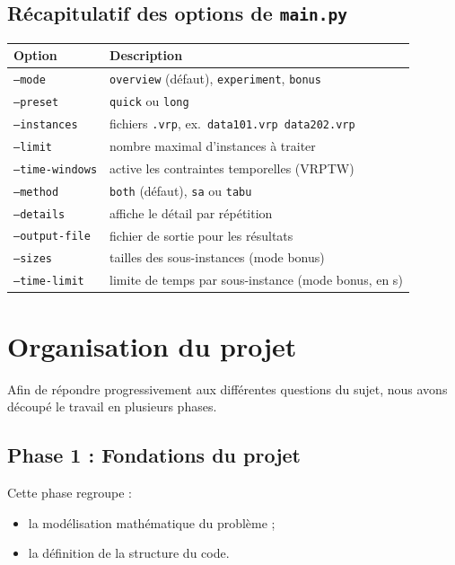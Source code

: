 \documentclass[11pt,a4paper]{article}
\begin{document}
\subsection{Récapitulatif des options de \texttt{main.py}}

\begin{center}
\begin{tabular}{ll}
\toprule
Option & Description \\
\midrule
\texttt{--mode} & \texttt{overview} (défaut), \texttt{experiment}, \texttt{bonus} \\
\texttt{--preset} & \texttt{quick} ou \texttt{long} \\
\texttt{--instances} & fichiers \texttt{.vrp}, ex.\ \texttt{data101.vrp data202.vrp} \\
\texttt{--limit} & nombre maximal d'instances à traiter \\
\texttt{--time-windows} & active les contraintes temporelles (VRPTW) \\
\texttt{--method} & \texttt{both} (défaut), \texttt{sa} ou \texttt{tabu} \\
\texttt{--details} & affiche le détail par répétition \\
\texttt{--output-file} & fichier de sortie pour les résultats \\
\texttt{--sizes} & tailles des sous-instances (mode bonus) \\
\texttt{--time-limit} & limite de temps par sous-instance (mode bonus, en s) \\
\bottomrule
\end{tabular}
\end{center}

\section{Organisation du projet}

Afin de répondre progressivement aux différentes questions du sujet, nous avons découpé le travail en plusieurs phases.

\subsection{Phase 1 : Fondations du projet}
Cette phase regroupe :
\begin{itemize}
    \item la modélisation mathématique du problème ;
    \item la définition de la structure du code.
\end{itemize}
\end{document}
